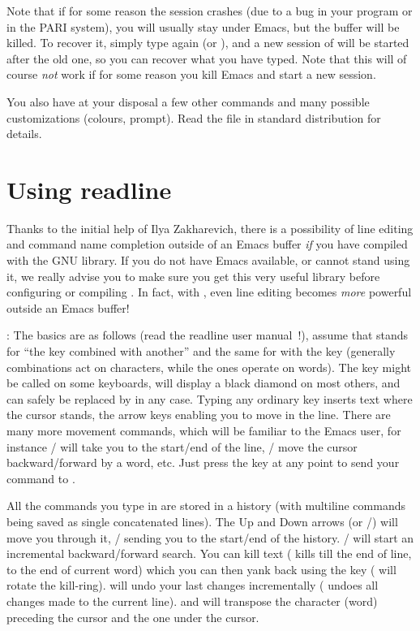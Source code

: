 Note that if for some reason the session crashes (due to a bug in your
program or in the PARI system), you will usually stay under Emacs, but the
 buffer will be killed. To recover it, simply type again 
(or ), and a new session of  will be started after
the old one, so you can recover what you have typed. Note that this will of
course \emph{not} work if for some reason you kill Emacs and start a new
session.

\smallskip You also have at your disposal a few other commands and many
possible customizations (colours, prompt). Read the file
 in standard distribution for details.


\section{Using readline} 

  Thanks to the initial help of Ilya Zakharevich, there is a possibility of
line editing and command name completion outside of an Emacs buffer \emph{if}
you have compiled  with the GNU  library. If you do not
have Emacs available, or cannot stand using it, we really advise you to make
sure you get this very useful library before configuring or compiling
. In fact, with , even line editing becomes \emph{more}
powerful outside an Emacs buffer!

: \label{se:readline} The
basics are as follows (read the readline user manual~!), assume that 
stands for ``the  key combined with another'' and the same for
 with the  key (generally  combinations act on
characters, while the  ones operate on words). The  key
might be called  on some keyboards, will display a black diamond on
most others, and can safely be replaced by  in any case. Typing any
ordinary key inserts text where the cursor stands, the arrow keys enabling
you to move in the line. There are many more movement commands, which will be
familiar to the Emacs user, for instance / will take you to
the start/end of the line, / move the cursor
backward/forward by a word, etc. Just press the  key at any
point to send your command to .

  All the commands you type in are stored in a history (with multiline
commands being saved as single concatenated lines). The Up and Down arrows
(or /) will move you through it, /
sending you to the start/end of the history. / will start
an incremental backward/forward search. You can kill text ( kills
till the end of line,  to the end of current word) which you can
then yank back using the  key ( will rotate the kill-ring).
 will undo your last changes incrementally ( undoes all
changes made to the current line).  and  will transpose the
character (word) preceding the cursor and the one under the cursor.

